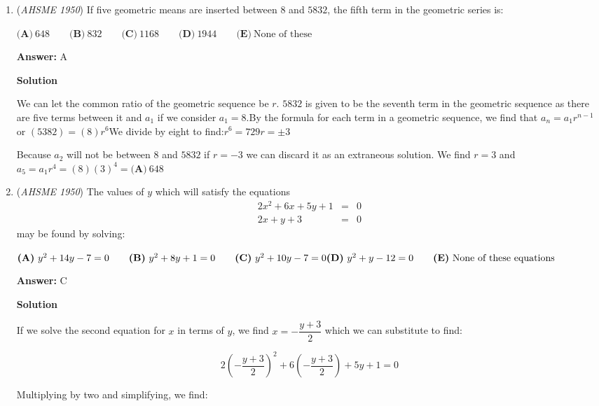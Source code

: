 \begin{enumerate}
 
 \[\frac{a^2-b^2}{ab}+\frac{b}{a}=\frac{a^2-b^2}{ab}+\frac{b^2}{ab} = \frac{a^2}{ab} = \boxed{\mathrm{(A) }\frac{a}{b}}\]

 obs: Assume that $a \not = 0, b\not = 0, a\not = b$.

 


	\item (\textit{AHSME 1950}) If five geometric means are inserted between $8$ and $5832$, the fifth term in the geometric series is:


 $\textbf{(A)}\ 648\qquad\textbf{(B)}\ 832\qquad\textbf{(C)}\ 1168\qquad\textbf{(D)}\ 1944\qquad\textbf{(E)}\ \text{None of these}$

 \textbf{Answer: }A



\textbf{Solution}

We can let the common ratio of the geometric sequence be $r$. $5832$ is given to be the seventh term in the geometric sequence as there are five terms between it and $a_1$ if we consider $a_1=8$.By the formula for each term in a geometric sequence, we find that $a_n=a_1r^{n-1}$ or $(5382)=(8)r^6$We divide by eight to find:$r^6=729$$r=\pm 3$

 Because $a_2$  will not be between $8$ and $5832$ if $r=-3$ we can discard it as an extraneous solution. We find $r=3$ and $a_5=a_1r^4=(8)(3)^4=\boxed{\textbf{(A)}\ 648}$



	\item (\textit{AHSME 1950}) The values of $y$ which will satisfy the equations 
 \[\begin{array}{rcl} 2x^{2}+6x+5y+1&=&0\\ 2x+y+3&=&0 \end{array}\] may be found by solving:


 $\textbf{(A)}\ y^{2}+14y-7=0\qquad\textbf{(B)}\ y^{2}+8y+1=0\qquad\textbf{(C)}\ y^{2}+10y-7=0\qquad\\ \textbf{(D)}\ y^{2}+y-12=0\qquad \textbf{(E)}\ \text{None of these equations}$

 \textbf{Answer: }C



\textbf{Solution}

If we solve the second equation for $x$ in terms of $y$, we find $x=-\dfrac{y+3}{2}$ which we can substitute to find:

 
 \[2(-\dfrac{y+3}{2})^2+6(-\dfrac{y+3}{2})+5y+1=0\]

 Multiplying by two and simplifying, we find:


\end{enumerate}
